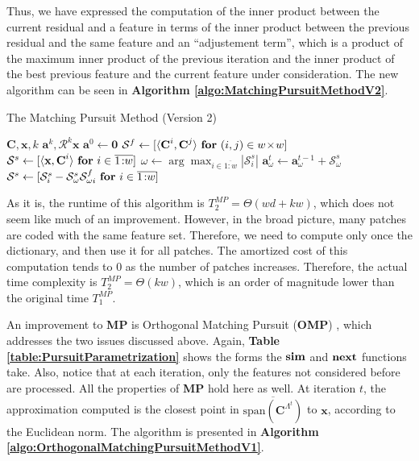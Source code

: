 \documentclass[12pt,a4paper,oneside,english]{UPBThesis}
\newcommand{\hctimes}[2]{{#1}\!\times\!{#2}}
\newcommand{\hcrange}[2]{\overline{{#1}\colon\!\!{#2}}}
\begin{document}
Thus, we have expressed the computation of the inner product between the current residual and a feature in terms of the inner product between the previous residual and the same feature and an ``adjustement term'', which is a product of the maximum inner product of the previous iteration and the inner product of the best previous feature and the current feature under consideration. The new algorithm can be seen in \textbf{Algorithm \ref{algo:MatchingPursuitMethodV2}}.

\begin{algorithm}
\caption{The Matching Pursuit Method (Version 2)}
\label{algo:MatchingPursuitMethodV2}
\begin{algorithmic}
\Require $\textbf{C},\textbf{x},k$
\Ensure $\textbf{a}^k,\mathcal{R}^k\textbf{x}$
\State $\textbf{a}^0 \gets \textbf{0}$
\State $\mathcal{S}^f \gets [ \langle \textbf{C}^i, \textbf{C}^j \rangle ~ \mbox{\textbf{for} $(i,j) \in \hctimes{w}{w}$}]$
\State $\mathcal{S}^s \gets [ \langle \textbf{x}, \textbf{C}^i \rangle ~ \mbox{\textbf{for} $i \in \hcrange{1}{w}$} ]$
\For {$t = \hcrange{1}{k}$}
\State $\omega \gets \arg \max_{i \in \hcrange{1}{w}} \left| \mathcal{S}_i^s \right|$
\State $\textbf{a}_\omega^t \gets \textbf{a}_\omega^{t-1} + \mathcal{S}_\omega^s$
\State $\mathcal{S}^s \gets [ \mathcal{S}_i^s - \mathcal{S}_\omega^s \mathcal{S}_{\omega i}^f ~ \mbox{\textbf{for} $i \in \hcrange{1}{w}$} ]$
\EndFor
\end{algorithmic}
\end{algorithm}

As it is, the runtime of this algorithm is $T_2^{MP} = \Theta(wd + kw)$, which does not seem like much of an improvement. However, in the broad picture, many patches are coded with the same feature set. Therefore, we need to compute only once the dictionary, and then use it for all patches. The amortized cost of this computation tends to $0$ as the number of patches increases. Therefore, the actual time complexity is $T_2^{MP} = \Theta(kw)$, which is an order of magnitude lower than the original time $T_1^{MP}$.

An improvement to \textbf{MP} is Orthogonal Matching Pursuit (\textbf{OMP}) \cite{matchingpursuit2,orthopursuit,pursuitdifferences}, which addresses the two issues discussed above. Again, \textbf{Table \ref{table:PursuitParametrization}} shows the forms the $\text{\textbf{sim}}$ and $\text{\textbf{next}}$ functions take. Also, notice that at each iteration, only the features not considered before are processed. All the properties of \textbf{MP} hold here as well. At iteration $t$, the approximation computed is the closest point in $\overline{\text{span}(\textbf{C}^{\Lambda^t})}$ to $\textbf{x}$, according to the Euclidean norm. The algorithm is presented in \textbf{Algorithm \ref{algo:OrthogonalMatchingPursuitMethodV1}}.
\end{document}
